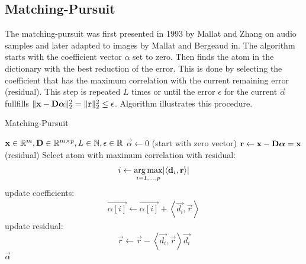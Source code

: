 \subsection{Matching-Pursuit}
\label{sec:mp}
The matching-pursuit was first presented in 1993 by Mallat and
Zhang\cite{Mallat1993} on audio samples and later adapted to images by Mallat
and Bergeaud in\cite{Mallat1995}.
The algorithm starts with the coefficient vector $\alpha$ set
to zero. Then finds the atom in the dictionary with the best reduction of the
error. This is done by selecting the coefficient that has the maximum
correlation with the current remaining error (residual). This step is repeated
$L$ times or until the error $\epsilon$
for the current $\vec{\alpha}$ fullfills $\lVert \boldsymbol{\mathrm{x}} - \boldsymbol{\mathrm{D}}\boldsymbol{\mathrm{\alpha}}
\rVert^{2}_{2} = \lVert \boldsymbol{\mathrm{r}} \rVert_2^2 \leq \epsilon$.
Algorithm  illustrates this procedure.
\begin{algorithm}[h]
\caption{Matching-Pursuit}
\label{alg:mp}
\begin{algorithmic}[1]
\REQUIRE $\boldsymbol{\mathrm{x}} \in \mathbb{R}^m, \boldsymbol{\mathrm{D}} \in \mathbb{R}^{m\times p}, L \in
\mathbb{N}, \epsilon \in \mathbb{R}$
\STATE $\vec{\alpha} \gets 0$ (start with zero vector)
\STATE $\boldsymbol{\mathrm{r}} \gets \boldsymbol{\mathrm{x}}-\boldsymbol{\mathrm{D}}\boldsymbol{\mathrm{\alpha}} = \boldsymbol{\mathrm{x}}$ (residual) 
\STATE Select atom with maximum correlation with residual: 
\begin{equation*}
i \gets \operatorname*{arg\,max}_{i=1,...,p} \lvert \left<\boldsymbol{\mathrm{d}}_i,\boldsymbol{\mathrm{r}}\right> \rvert
\end{equation*}
\STATE update coefficients: 
\begin{align}
\vec{\alpha[i]}  \gets \vec{\alpha[i]} + \left<\vec{d_i},\vec{r}\right>
\label{eq:mp_update}
\end{align}
\STATE update residual:
\begin{equation*}
 \vec{r} \gets \vec{r} - \left<\vec{d_i},\vec{r}\right>\vec{d_i}
\end{equation*}
\ENDWHILE
\RETURN $\vec{\alpha}$
\end{algorithmic}
\end{algorithm}

